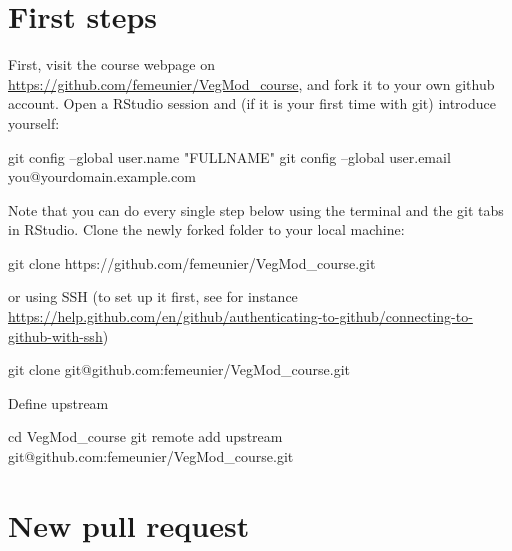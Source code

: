 \documentclass[
  oneside]{book}
\newenvironment{Shaded}{\begin{snugshade}}{\end{snugshade}}
\newcommand{\BuiltInTok}[1]{#1}
\newcommand{\FunctionTok}[1]{\textcolor[rgb]{0.00,0.00,0.00}{#1}}
\newcommand{\NormalTok}[1]{#1}
\newcommand{\StringTok}[1]{\textcolor[rgb]{0.31,0.60,0.02}{#1}}
\begin{document}
\hypertarget{first-steps}{%
\section*{First steps}\label{first-steps}}

First, visit the course webpage on \url{https://github.com/femeunier/VegMod_course}, and fork it to your own github account. Open a RStudio session and (if it is your first time with git) introduce yourself:

\begin{Shaded}
\begin{Highlighting}[]
\FunctionTok{git}\NormalTok{ config --global user.name }\StringTok{"FULLNAME"}
\FunctionTok{git}\NormalTok{ config --global user.email you@yourdomain.example.com}
\end{Highlighting}
\end{Shaded}

Note that you can do every single step below using the terminal and the git tabs in RStudio. Clone the newly forked folder to your local machine:

\begin{Shaded}
\begin{Highlighting}[]
\FunctionTok{git}\NormalTok{ clone https://github.com/femeunier/VegMod_course.git}
\end{Highlighting}
\end{Shaded}

or using SSH (to set up it first, see for instance \url{https://help.github.com/en/github/authenticating-to-github/connecting-to-github-with-ssh})

\begin{Shaded}
\begin{Highlighting}[]
\FunctionTok{git}\NormalTok{ clone git@github.com:femeunier/VegMod_course.git}
\end{Highlighting}
\end{Shaded}

Define upstream

\begin{Shaded}
\begin{Highlighting}[]
\BuiltInTok{cd}\NormalTok{ VegMod_course}
\FunctionTok{git}\NormalTok{ remote add upstream git@github.com:femeunier/VegMod_course.git}
\end{Highlighting}
\end{Shaded}

\hypertarget{new-pull-request}{%
\section*{New pull request}\label{new-pull-request}}
\end{document}
